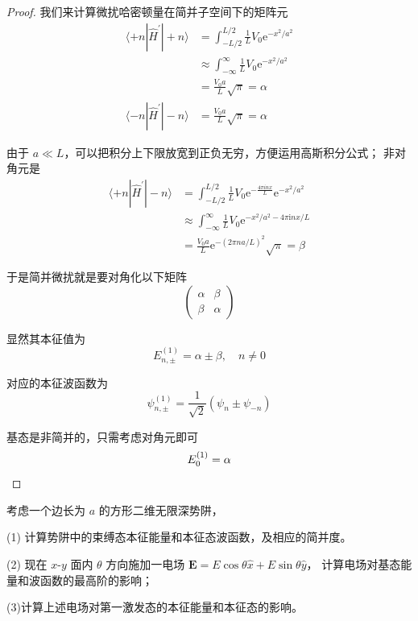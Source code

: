 \begin{proof}
    我们来计算微扰哈密顿量在简并子空间下的矩阵元
$$\begin{aligned}
\langle+n| \hat{H}^{\prime}|+n\rangle & =\int_{-L / 2}^{L / 2} \frac{1}{L} V_{0} \mathrm{e}^{-x^{2} / a^{2}} \\
& \approx \int_{-\infty}^{\infty} \frac{1}{L} V_{0} \mathrm{e}^{-x^{2} / a^{2}} \\
& =\frac{V_{0} a}{L} \sqrt{\pi}=\alpha \\
\langle-n| \hat{H}^{\prime}|-n\rangle & =\frac{V_{0} a}{L} \sqrt{\pi}=\alpha
\end{aligned}$$

由于 $a \ll L$，可以把积分上下限放宽到正负无穷，方便运用高斯积分公式；
非对角元是
$$\begin{aligned}
\langle+n| \hat{H}^{\prime}|-n\rangle & =\int_{-L / 2}^{L / 2} \frac{1}{L} V_{0} \mathrm{e}^{-\frac{4 \pi i n x}{L}} \mathrm{e}^{-x^{2} / a^{2}} \\
& \approx \int_{-\infty}^{\infty} \frac{1}{L} V_{0} \mathrm{e}^{-x^{2} / a^{2}-4 \pi \mathrm{i} n x / L} \\
& =\frac{V_{0} a}{L} \mathrm{e}^{-(2 \pi n a / L)^{2}} \sqrt{\pi}=\beta
\end{aligned}$$

于是简并微扰就是要对角化以下矩阵
$$\begin{pmatrix}
\alpha & \beta \\
\beta & \alpha
\end{pmatrix}$$

显然其本征值为
$$E_{n, \pm}^{(1)}=\alpha \pm \beta, \quad n \neq 0$$

对应的本征波函数为
$$\psi_{n, \pm}^{(1)}=\frac{1}{\sqrt{2}}\left(\psi_{n} \pm \psi_{-n}\right)$$

基态是非简并的，只需考虑对角元即可
$$E_{0}^{(1)}=\alpha\qedhere$$
\end{proof}
\begin{3}
    考虑一个边长为 $a$ 的方形二维无限深势阱，

(1) 计算势阱中的束缚态本征能量和本征态波函数，及相应的简并度。

(2) 现在 $x$-$y$ 面内 $\theta$ 方向施加一电场 $\mathbf{E}=E \cos \theta \hat{x}+E \sin \theta \hat{y}$，
计算电场对基态能量和波函数的最高阶的影响；

(3)计算上述电场对第一激发态的本征能量和本征态的影响。
\end{3}
